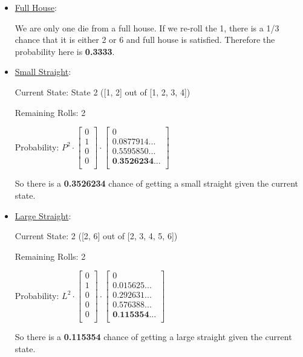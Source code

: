 \documentclass[12pt,a4paper]{article}
\begin{document}
\begin{enumerate}
\begin{itemize}
    \item \underline{Full House}:

    We are only one die from a full house. If we re-roll the 1, there is a 1/3 chance that it is either 2 or 6 and full house is satisfied. Therefore the probability here is \textbf{0.3333}.

    \item \underline{Small Straight}:

    Current State: State 2 ([1, 2] out of [1, 2, 3, 4])

    Remaining Rolls: 2

    Probability: $P^2 \cdot \begin{bmatrix}
0 \\
1 \\
0 \\
0 \\
\end{bmatrix} \cdot \begin{bmatrix}
0 \\
0.0877914... \\
0.5595850... \\
\textbf{0.3526234...} \\
\end{bmatrix}$

So there is a \textbf{0.3526234} chance of getting a small straight given the current state.

    \item \underline{Large Straight}:

    Current State: 2 ([2, 6] out of [2, 3, 4, 5, 6])

    Remaining Rolls: 2

    Probability: $L^2 \cdot \begin{bmatrix}
0 \\
1 \\
0 \\
0 \\
0 \\
\end{bmatrix} \cdot \begin{bmatrix}
0 \\
0.015625... \\
0.292631... \\
0.576388... \\
\textbf{0.115354...} \\
\end{bmatrix}$

So there is a \textbf{0.115354} chance of getting a large straight given the current state.


\end{itemize}
\end{enumerate}
\end{document}
